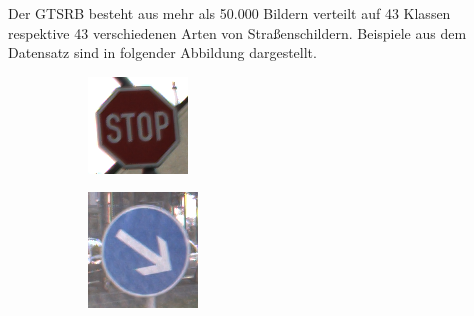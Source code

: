 Der \ac{GTSRB} besteht aus mehr als 50.000 Bildern verteilt auf 43 Klassen respektive 43 verschiedenen Arten von Straßenschildern. Beispiele aus dem Datensatz sind in folgender Abbildung dargestellt.
\begin{figure}[H]
   \centering
   \begin{subfigure}[b]{0.125\textwidth}
       \centering
       \includegraphics[height=\textwidth]{../images/GTSRB/00093.png}
       \caption{}
       \label{fig:gtrsb-paper-bsp-image-1}
   \end{subfigure}
   \hspace{3em}%
   \begin{subfigure}[b]{0.125\textwidth}
       \centering
       \includegraphics[height=\textwidth]{../images/GTSRB/00847.png}

\end{subfigure}
\end{figure}
